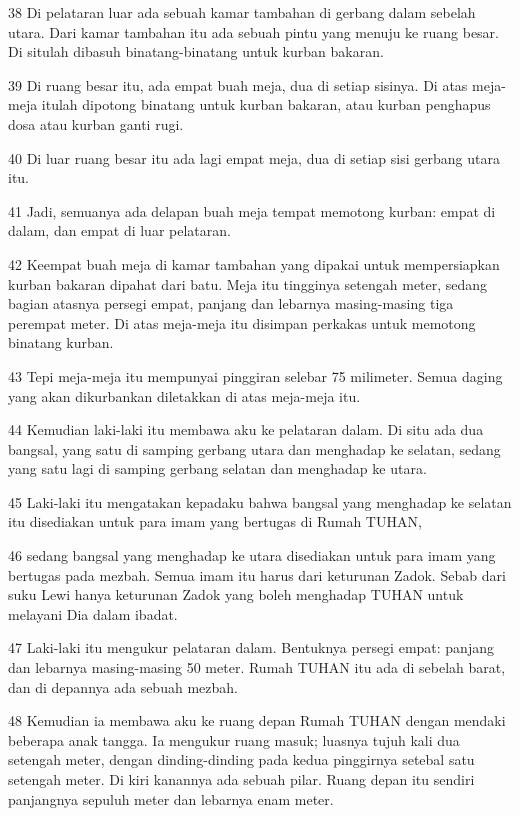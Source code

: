 \par 38 Di pelataran luar ada sebuah kamar tambahan di gerbang dalam sebelah utara. Dari kamar tambahan itu ada sebuah pintu yang menuju ke ruang besar. Di situlah dibasuh binatang-binatang untuk kurban bakaran.
\par 39 Di ruang besar itu, ada empat buah meja, dua di setiap sisinya. Di atas meja-meja itulah dipotong binatang untuk kurban bakaran, atau kurban penghapus dosa atau kurban ganti rugi.
\par 40 Di luar ruang besar itu ada lagi empat meja, dua di setiap sisi gerbang utara itu.
\par 41 Jadi, semuanya ada delapan buah meja tempat memotong kurban: empat di dalam, dan empat di luar pelataran.
\par 42 Keempat buah meja di kamar tambahan yang dipakai untuk mempersiapkan kurban bakaran dipahat dari batu. Meja itu tingginya setengah meter, sedang bagian atasnya persegi empat, panjang dan lebarnya masing-masing tiga perempat meter. Di atas meja-meja itu disimpan perkakas untuk memotong binatang kurban.
\par 43 Tepi meja-meja itu mempunyai pinggiran selebar 75 milimeter. Semua daging yang akan dikurbankan diletakkan di atas meja-meja itu.
\par 44 Kemudian laki-laki itu membawa aku ke pelataran dalam. Di situ ada dua bangsal, yang satu di samping gerbang utara dan menghadap ke selatan, sedang yang satu lagi di samping gerbang selatan dan menghadap ke utara.
\par 45 Laki-laki itu mengatakan kepadaku bahwa bangsal yang menghadap ke selatan itu disediakan untuk para imam yang bertugas di Rumah TUHAN,
\par 46 sedang bangsal yang menghadap ke utara disediakan untuk para imam yang bertugas pada mezbah. Semua imam itu harus dari keturunan Zadok. Sebab dari suku Lewi hanya keturunan Zadok yang boleh menghadap TUHAN untuk melayani Dia dalam ibadat.
\par 47 Laki-laki itu mengukur pelataran dalam. Bentuknya persegi empat: panjang dan lebarnya masing-masing 50 meter. Rumah TUHAN itu ada di sebelah barat, dan di depannya ada sebuah mezbah.
\par 48 Kemudian ia membawa aku ke ruang depan Rumah TUHAN dengan mendaki beberapa anak tangga. Ia mengukur ruang masuk; luasnya tujuh kali dua setengah meter, dengan dinding-dinding pada kedua pinggirnya setebal satu setengah meter. Di kiri kanannya ada sebuah pilar. Ruang depan itu sendiri panjangnya sepuluh meter dan lebarnya enam meter.

